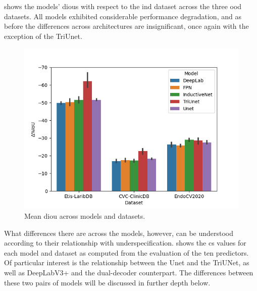  shows the models' \glspl{diou} with respect to the \gls{ind} dataset across the three \gls{ood} datasets. All models exhibited considerable performance degradation, and as before the differences across architectures are insignificant, once again with the exception of the TriUnet. 
    \begin{figure}[ht]
        \centering
        \includegraphics[width=\linewidth]{illustrations/delta_iou_baseline.png}
        \caption{Mean \gls{diou} across models and datasets.}
        \label{fig:baseline_ious}
    \end{figure}

    What differences there are across the models, however, can be understood according to their relationship with underspecification.  shows the \gls{cs} values for each model and dataset as computed from the evaluation of the ten predictors. Of particular interest is the relationship between the Unet and the TriUNet, as well as DeepLabV3+ and the dual-decoder counterpart. The differences between these two pairs of models will be discussed in further depth below.
    
